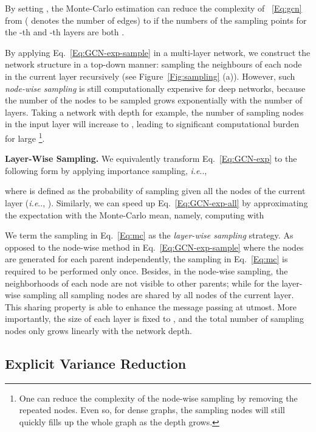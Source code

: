 \documentclass{article}
\makeatletter
\DeclareRobustCommand\onedot{\futurelet\@let@token\@onedot}
\def\@onedot{\ifx\@let@token.\else.\null\fi\xspace}
\def\ie{\emph{i.e}\onedot} \def\Ie{\emph{I.e}\onedot}
\makeatother
\begin{document}
\vskip -0.1in
By setting , the Monte-Carlo estimation can reduce the complexity of ~\eqref{Eq:gcn} from  ( denotes the number of edges)  to  if the numbers of the sampling points for the -th and -th layers are both .


By applying Eq.~\eqref{Eq:GCN-exp-sample} in a multi-layer network, we construct the network structure in a top-down manner: sampling the neighbours of each node in the current layer recursively (see Figure~\ref{Fig:sampling} (a)). However, such \emph{node-wise sampling} is still computationally expensive for deep networks, because the number of the nodes to be sampled grows exponentially with the number of layers. Taking a network with depth  for example, the number of sampling nodes in the input layer will increase to , leading to significant computational burden for large \footnote{One can reduce the complexity of the node-wise sampling by removing the repeated nodes. Even so, for dense graphs, the sampling nodes will still quickly fills up the whole graph as the depth grows. }.





\textbf{Layer-Wise Sampling.} We equivalently transform Eq.~\eqref{Eq:GCN-exp} to the following form by applying importance sampling, \ie,
\vskip -0.3in

\vskip -0.1in
where  is defined as the probability of sampling  given all the nodes of the current layer (\ie, ). Similarly, we can speed up Eq.~\eqref{Eq:GCN-exp-all} by approximating the expectation with the Monte-Carlo mean, namely, computing  with
\vskip -0.3in

\vskip -0.1in

We term the sampling in Eq.~\eqref{Eq:mc} as the \emph{layer-wise sampling} strategy. As opposed to the node-wise method in Eq.~\eqref{Eq:GCN-exp-sample} where the nodes  are generated for each parent  independently, the sampling in Eq.~\eqref{Eq:mc} is required to be performed only once. Besides, in the node-wise sampling, the neighborhoods of each node are not visible to other parents; while for the layer-wise sampling all sampling nodes  are shared by all nodes of the current layer. This sharing property is able to enhance the message passing at utmost. More importantly, the size of each layer is fixed to , and the total number of sampling nodes only grows linearly with the network depth.





\subsection{Explicit Variance Reduction}
\label{Sec:sampler}
\end{document}
